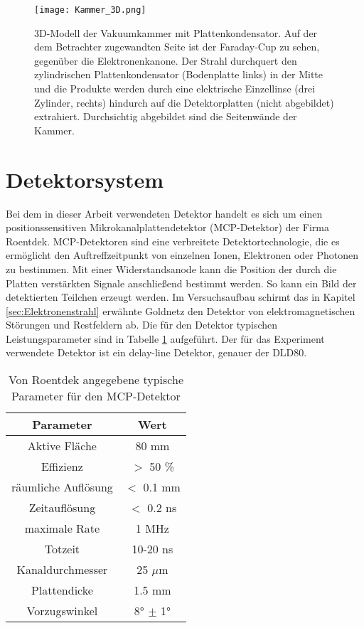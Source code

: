 \begin{figure}
    \centering
    \hspace{-2.8cm}\texttt{[image: Kammer\_3D.png]}
    \caption[3D-Modell der Vakuumkammer mit Plattenkondensator]{3D-Modell der Vakuumkammer mit Plattenkondensator. Auf der dem Betrachter zugewandten Seite ist der Faraday-Cup zu sehen, gegenüber die Elektronenkanone. Der Strahl durchquert den zylindrischen Plattenkondensator (Bodenplatte links) in der Mitte und die Produkte werden durch eine elektrische Einzellinse (drei Zylinder, rechts) hindurch auf die Detektorplatten (nicht abgebildet) extrahiert. Durchsichtig abgebildet sind die Seitenwände der Kammer.}
    \label{fig:3D}
\end{figure}

\section{Detektorsystem}
Bei dem in dieser Arbeit verwendeten Detektor handelt es sich um einen positionssensitiven Mikrokanalplattendetektor (MCP-Detektor) der Firma Roentdek. MCP-Detektoren sind eine verbreitete Detektortechnologie, die es ermöglicht den Auftreffzeitpunkt von einzelnen Ionen, Elektronen oder Photonen zu bestimmen. Mit einer Widerstandsanode kann die Position der durch die Platten verstärkten Signale anschließend bestimmt werden. So kann ein Bild der detektierten Teilchen erzeugt werden. Im Versuchsaufbau schirmt das in Kapitel \ref{sec:Elektronenstrahl} erwähnte Goldnetz den Detektor von elektromagnetischen Störungen und Restfeldern ab. Die für den Detektor typischen Leistungsparameter sind in Tabelle \ref{tab:MCP} aufgeführt. Der für das Experiment verwendete Detektor ist ein delay-line Detektor, genauer der DLD80.


\begin{table}[h]
    \centering
    \caption{Von Roentdek angegebene typische Parameter für den MCP-Detektor}
    \begin{tabular}{c|c}
        Parameter & Wert \\
        \hline
        Aktive Fläche & 80 mm \\
        Effizienz & $>$ 50 \% \\
        räumliche Auflösung & $<$ 0.1 mm \\
        Zeitauflösung & $<$ 0.2 ns \\
        maximale Rate & 1 MHz \\
        Totzeit & 10-20 ns \\
        Kanaldurchmesser & 25 $\mu$m \\
        Plattendicke & 1.5 mm \\
        Vorzugswinkel & \ang{8} $\pm$ \ang{1} \\

    \end{tabular}
    \label{tab:MCP}
\end{table}

